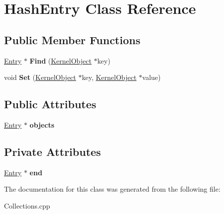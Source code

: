 \hypertarget{class_hash_entry}{}\section{Hash\+Entry Class Reference}
\label{class_hash_entry}
\subsection*{Public Member Functions}
\begin{DoxyCompactItemize}
\item 
\mbox{\label{class_hash_entry_aa260f33a43f839975ed37c251b80ed4b}} 
\hyperlink{class_entry}{Entry} $\ast$ {\bfseries Find} (\hyperlink{class_kernel_object}{Kernel\+Object} $\ast$key)
\item 
\mbox{\label{class_hash_entry_ae893b9bbf0703e06408ac681671ed160}} 
void {\bfseries Set} (\hyperlink{class_kernel_object}{Kernel\+Object} $\ast$key, \hyperlink{class_kernel_object}{Kernel\+Object} $\ast$value)
\end{DoxyCompactItemize}
\subsection*{Public Attributes}
\begin{DoxyCompactItemize}
\item 
\mbox{\label{class_hash_entry_a90d5921900705c1658b1d384ce9f0394}} 
\hyperlink{class_entry}{Entry} $\ast$ {\bfseries objects}
\end{DoxyCompactItemize}
\subsection*{Private Attributes}
\begin{DoxyCompactItemize}
\item 
\mbox{\label{class_hash_entry_a0ae97dc4f2e30ad7b42c46a990b30b76}} 
\hyperlink{class_entry}{Entry} $\ast$ {\bfseries end}
\end{DoxyCompactItemize}


The documentation for this class was generated from the following file\+:\begin{DoxyCompactItemize}
\item 
Collections.\+cpp\end{DoxyCompactItemize}
